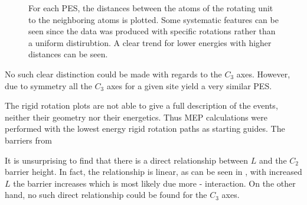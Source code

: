 \begin{figure}[h]
\begin{center}
    \parbox{0.85\linewidth}{
      \caption{For each PES, the distances between the  atoms of the rotating  unit to the neighboring  atoms is plotted.
Some systematic features can be seen since the data was produced with specific rotations rather than a uniform distirubtion.
A clear trend for lower energies with higher distances can be seen.
      }
      \label{fig:h-mg-distances}
    }
\end{center}
\end{figure}


No such clear distinction could be made with regards to the $C_3$ axes.
However, due to symmetry all the $C_3$ axes for a given site yield a very similar PES. 

The rigid rotation plots are not able to give a full description of the events, neither their geometry nor their energetics.
Thus MEP calculations were performed with the lowest energy rigid rotation paths as starting guides.
The barriers from 


It is unsurprising to find that there is a direct relationship between $L$ and the $C_2$ barrier height.
In fact, the relationship is linear, as can be seen in , with increased $L$ the barrier increases which is most likely due more - interaction.
On the other hand, no such direct relationship could be found for the $C_3$ axes.

\incomplete
